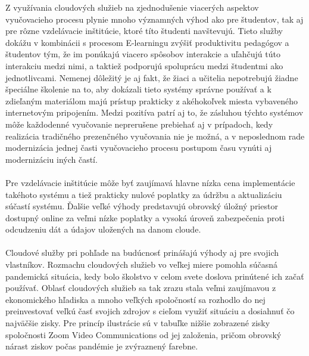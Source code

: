 \documentclass[10pt,slovak,a4paper]{article}%
\begin{document}
Z využívania cloudových služieb na zjednodušenie viacerých aspektov vyučovacieho procesu plynie mnoho významných výhod ako pre študentov, tak aj pre rôzne vzdelávacie inštitúcie, ktoré títo študenti navštevujú. Tieto služby dokážu v kombinácii s procesom E-learningu zvýšiť produktivitu pedagógov a študentov tým, že im ponúkajú viacero spôsobov interakcie a uľahčujú túto interakciu medzi nimi, a taktiež podporujú spoluprácu medzi študentmi ako jednotlivcami\cite{Mhouti_benefits_challenges}. Nemenej dôležitý je aj fakt, že žiaci a učitelia nepotrebujú žiadne špeciálne školenie na to, aby dokázali tieto systémy správne používať a k zdieľaným materiálom majú prístup prakticky z akéhokoľvek miesta vybaveného internetovým pripojením\cite{Koutsopoulos_schooloncloud}. Medzi pozitíva patrí aj to, že zásluhou týchto systémov môže každodenné vyučovanie neprerušene prebiehať aj v prípadoch, kedy realizácia tradičného prezenčného vyučovania nie je možná, a v neposlednom rade modernizácia jednej časti vyučovacieho procesu postupom času vynúti aj modernizáciu iných častí.
\\
\\
Pre vzdelávacie inštitúcie môže byť zaujímavá hlavne nízka cena implementácie takéhoto systému a tiež prakticky nulové poplatky za údržbu a aktualizáciu súčastí systému\cite{Narkar_cloud-basededucation}. Ďalšie veľké výhody predstavujú obrovský úložný priestor dostupný online za veľmi nízke poplatky a vysoká úroveň zabezpečenia proti odcudzeniu dát a údajov uložených na danom cloude\cite{Mhouti_benefits_challenges}. 
\\
\\
Cloudové služby pri pohľade na budúcnosť prinášajú výhody aj pre svojich vlastníkov. Rozmachu cloudových služieb vo veľkej miere pomohla súčasná pandemická situácia, kedy bolo školstvo v celom svete doslova prinútené ich začať používať. Oblasť cloudových služieb sa tak zrazu stala veľmi zaujímavou z ekonomického hľadiska a mnoho veľkých spoločností sa rozhodlo do nej preinvestovať veľkú časť svojich zdrojov s cieľom využiť situáciu a dosiahnuť čo najväčšie zisky. Pre princíp ilustrácie sú v tabuľke nižšie zobrazené zisky spoločnosti Zoom Video Communications od jej založenia, pričom obrovský nárast ziskov počas pandémie je zvýraznený farebne.
\end{document}
